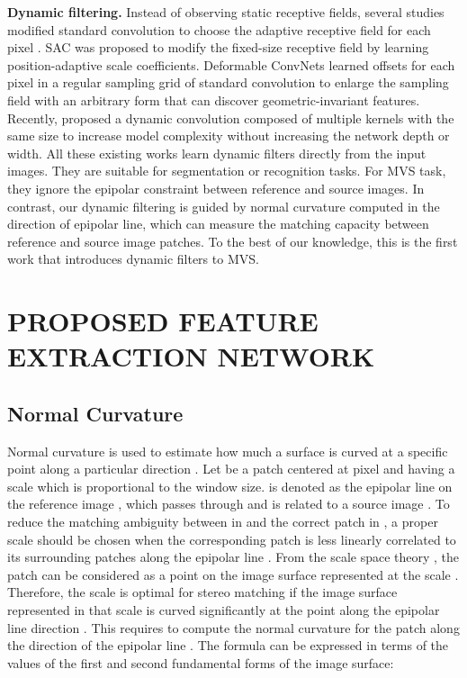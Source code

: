 \documentclass{article} \usepackage{iclr2022_conference,times}
\begin{document}
\textbf{Dynamic filtering.} Instead of observing static receptive fields, several studies modified standard convolution to choose the adaptive receptive field for each pixel \citep{wu2018dynamic,jia2016dynamic,han2018face}. SAC \citep{zhang2017scale} was proposed to modify the fixed-size receptive field by learning position-adaptive scale coefficients. Deformable ConvNets \citep{dai2017deformable,zhu2019deformable} learned offsets for each pixel in a regular sampling grid of standard convolution to enlarge the sampling field with an arbitrary form that can discover geometric-invariant features. Recently, \citet{chen2020dynamic} proposed a dynamic convolution composed of multiple kernels with the same size to increase model complexity without increasing the network depth or width. All these existing works learn dynamic filters directly from the input images. They are suitable for segmentation or recognition tasks. For MVS task, they ignore the epipolar constraint between reference and source images. In contrast, our dynamic filtering is guided by normal curvature computed in the direction of epipolar line, which can measure the matching capacity between reference and source image patches. To the best of our knowledge, this is the first work that introduces dynamic filters to MVS. 



\section{PROPOSED FEATURE EXTRACTION NETWORK}
\label{headings}
\subsection{Normal Curvature}
\label{normal_curvature}

Normal curvature is used to estimate how much a surface is curved at a specific point along a particular direction \citep{do2016differential}. Let  be a patch centered at pixel  and having a scale  which is proportional to the window size.  is denoted as the epipolar line on the reference image , which passes through  and is related to a source image . To reduce the matching ambiguity between  in  and the correct patch  in , a proper scale  should be chosen when the corresponding patch  is less linearly correlated to its surrounding patches along the epipolar line . From the scale space theory \citep{lindeberg1994scale}, the patch  can be considered as a point on the image surface represented at the scale . Therefore, the scale  is optimal for stereo matching if the image surface represented in that scale is curved significantly at the point  along the epipolar line direction \citep{xu2020marmvs}. This requires to compute the normal curvature for the patch  along the direction  of the epipolar line . The formula can be expressed in terms of the values of the first and second fundamental forms of the image surface:
\end{document}
